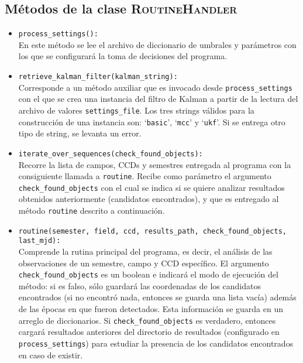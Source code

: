 \begin{appendix}
\section{M\'etodos de la clase \textsc{RoutineHandler}}
\label{subs:a4}
\begin{itemize}
\item \texttt{process\_settings():}\\
En este m\'etodo se lee el archivo de diccionario de umbrales y par\'ametros con los que se configurar\'a la toma de decisiones del programa.
\bigskip

\item \texttt{retrieve\_kalman\_filter(kalman\_string):}\\
Corresponde a un m\'etodo auxiliar que es invocado desde \texttt{process\_settings} con el que se crea una instancia del filtro de Kalman a partir de la lectura del archivo de valores \texttt{settings\_file}. Los tres strings v\'alidos para la construcci\'on de una instancia son: `\texttt{basic}', `\texttt{mcc}' y `\texttt{ukf}'. Si se entrega otro tipo de string, se levanta un error.
\bigskip
  
\item \texttt{iterate\_over\_sequences(check\_found\_objects):}\\
Recorre la lista de campos, CCDs y semestres entregada al programa con la consiguiente llamada a \texttt{routine}. Recibe como par\'ametro el argumento \texttt{check\_found\_objects} con el cual se indica si se quiere analizar resultados obtenidos anteriormente (candidatos encontrados), y que es entregado al m\'etodo \texttt{routine} descrito a continuaci\'on.
\bigskip

\item \texttt{routine(semester, field, ccd, results\_path, check\_found\_objects, last\_mjd):}\\
Comprende la rutina principal del programa, es decir, el an\'alisis de las observaciones de un semestre, campo y CCD espec\'ifico. El argumento \texttt{check\_found\_objects} es un boolean e indicar\'a el modo de ejecuci\'on del m\'etodo: si es falso, s\'olo guardar\'a las coordenadas de los candidatos encontrados (si no encontr\'o nada, entonces se guarda una lista vac\'ia) adem\'as de las \'epocas en que fueron detectados. Esta informaci\'on se guarda en un arreglo de diccionarios. Si \texttt{check\_found\_objects} es verdadero, entonces cargar\'a resultados anteriores del directorio de resultados (configurado en \texttt{process\_settings}) para estudiar la presencia de los candidatos encontrados en caso de existir.
\end{itemize} 
\pagebreak


\end{appendix}
